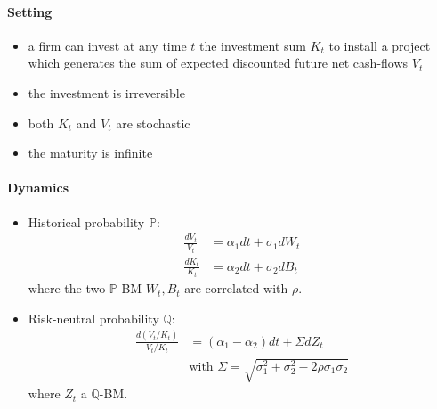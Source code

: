 \documentclass[a4paper,landscape,8pt,fleqn]{scrartcl}
\begin{document}
\begin{multicols*}{4}
\paragraph{Setting}
\begin{itemize}
\item a firm can invest at any time $t$ the investment sum $K_t$ to install a project which generates the sum of expected discounted future net cash-flows $V_t$
\item the investment is irreversible
\item both $K_t$ and $V_t$ are stochastic
\item the maturity is infinite
\end{itemize}

\paragraph{Dynamics}
\begin{itemize}
\item Historical probability $\mathbb{P}$:
\begin{align*}
\frac{dV_t}{V_t} &= \alpha_1 dt + \sigma_1 dW_t \\
\frac{dK_t}{K_t} &= \alpha_2 dt + \sigma_2 dB_t
\end{align*}
where the two $\mathbb{P}$-BM $W_t,B_t$ are correlated with $\rho$.
\item Risk-neutral probability $\mathbb{Q}$:
\begin{align*}
\frac{d(V_t/K_t)}{V_t/K_t} &= (\alpha_1 - \alpha_2) dt + \Sigma dZ_t \\
&\text{with } \Sigma = \sqrt{\sigma_1^2 + \sigma_2^2 - 2 \rho \sigma_1 \sigma_2}
\end{align*}
where $Z_t$ a $\mathbb{Q}$-BM.
\end{itemize}


\end{multicols*}
\end{document}
